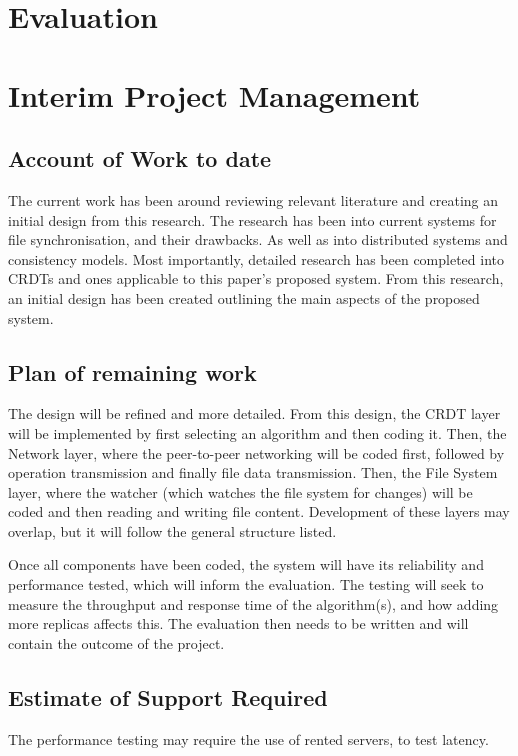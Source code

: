 \documentclass[12pt]{report}
\begin{document}
\chapter{Evaluation}

\printbibliography

\appendix

\chapter{Interim Project Management}

\section{Account of Work to date}
The current work has been around reviewing relevant literature and creating an initial design from this research. The research has been into current systems for file synchronisation, and their drawbacks. As well as into distributed systems and consistency models. Most importantly, detailed research has been completed into CRDTs and ones applicable to this paper's proposed system. From this research, an initial design has been created outlining the main aspects of the proposed system.

\section{Plan of remaining work}
The design will be refined and more detailed. From this design, the CRDT layer will be implemented by first selecting an algorithm and then coding it. Then, the Network layer, where the peer-to-peer networking will be coded first, followed by operation transmission and finally file data transmission. Then, the File System layer, where the watcher (which watches the file system for changes) will be coded and then reading and writing file content. Development of these layers may overlap, but it will follow the general structure listed. \par
Once all components have been coded, the system will have its reliability and performance tested, which will inform the evaluation. The testing will seek to measure the throughput and response time of the algorithm(s), and how adding more replicas affects this. The evaluation then needs to be written and will contain the outcome of the project.

\section{Estimate of Support Required}
The performance testing may require the use of rented servers, to test latency.
\end{document}
